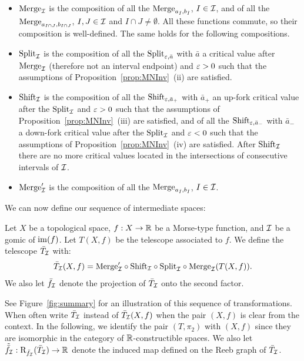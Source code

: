 \begin{itemize}
\item 
$\mathrm{Merge}_{\mathcal{I}}$
is the composition of all the
$\mathrm{Merge}_{a_{\tilde I},b_{\tilde I}}$, $I\in\mathcal{I}$, and of all the	
$\mathrm{Merge}_{a_{I\cap J},b_{I\cap J}}$, $I, J \in \mathcal{I}$ and  $ I\cap J\neq \emptyset$.  
All these functions commute, so their composition is well-defined. 
The same holds for the following compositions.
%
\item $\mathrm{Split}_{\mathcal{I}}$ is the composition of all the 
$\mathrm{Split}_{\varepsilon,\bar a}$ with $\bar a$ a critical value after  $\mathrm{Merge}_{\mathcal{I}}$ 
(therefore not an interval endpoint) and
$\varepsilon>0$ such that the assumptions of
Proposition~\ref{prop:MNInv}~(ii) are satisfied.
%
\item $\mathrm{Shift}_{\mathcal{I}}$ is the composition of all the
$\mathrm{Shift}_{\varepsilon,\bar a_+}$ with $\bar a_+$ an up-fork critical
value after the $\mathrm{Split}_{\mathcal{I}}$ and $\varepsilon>0$ such that the
assumptions of Proposition~\ref{prop:MNInv}~(iii) are satisfied, 
and of all the $\mathrm{Shift}_{\varepsilon,\bar a_-}$
with $\bar a_-$ a down-fork critical value after the $\mathrm{Split}_{\mathcal{I}}$ and
$\varepsilon<0$ such that the assumptions of
Proposition~\ref{prop:MNInv}~(iv) are satisfied.
After $\mathrm{Shift}_{\mathcal{I}}$ there are no more critical values
located in the intersections of consecutive intervals of $\mathcal{I}$.
\item  $\mathrm{Merge}'_{\mathcal{I}}$ is the composition of all the $\mathrm{Merge}_{a_{\tilde I},b_{\tilde I}}$, $I\in\mathcal{I}$.  
\end{itemize}

We can now define our sequence of intermediate spaces:

\begin{defin}\label{eq:final_transf}
Let $X$ be a topological space, $f:X\rightarrow \mathbb{R}$ be a Morse-type function, and $\mathcal{I}$ be a gomic of $\mathrm{im}(f)$.
Let  $T(X,f)$ be the telescope associated to $f$. We define the telescope $\bar T_{\mathcal I}$ with:
$$\bar T_{\mathcal I}(X,f)=\mathrm{Merge}'_{\mathcal{I}}\circ\mathrm{Shift}_{\mathcal{I}}\circ\mathrm{Split}_{\mathcal{I}}\circ\mathrm{Merge}_{\mathcal{I}}(T(X,f)).$$
We also let $\bar f_{\mathcal I}$ denote the projection of $\bar T_{\mathcal I}$ onto the second factor.
\end{defin}

%
See Figure~\ref{fig:summary} for an
illustration of this sequence of transformations.
When often write $\bar T_{\mathcal I}$ instead of $\bar T_{\mathcal I}(X,f)$ when the pair $(X,f)$ is clear from the context.
%
In the following, we identify the pair $(T,\pi_2)$
with $(X,f)$ since they are isomorphic in the category of
$\mathbb{R}$-constructible spaces.   
We also let $\tilde{\bar f}_{\mathcal I}:\mathrm{R}_{\bar f_{\mathcal I}}(\bar T_{\mathcal I})\rightarrow\mathbb{R}$ denote the induced map defined on the Reeb graph of $\bar T_{\mathcal I}$. 

